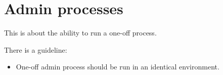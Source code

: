 \section*{Admin processes}
This is about the ability to run a one-off process.

There is a guideline:
\begin{itemize}
\item One-off admin process should be run in an identical environment.
\end{itemize}
